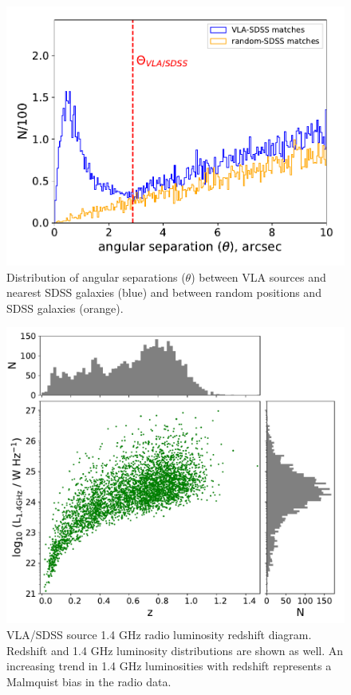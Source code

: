 \begin{figure}
 \begin{center}
  \includegraphics[width=0.75\columnwidth]{plots_chp2/sep_dist_opt.pdf}
  \caption[Cross-match radius determination for VLA/SDSS catalogue]{Distribution of angular separations ($\theta$) between VLA sources and nearest SDSS galaxies (blue) and  between random positions and  SDSS galaxies (orange).}
  \label{fig:jvla-sdss-dist}
 \end{center}
\end{figure}

\begin{figure}
 \begin{center}
   \includegraphics[width=0.8\columnwidth]{plots_chp2/radio_AGN_lum_redshift.pdf}
   \caption[VLA/SDSS source 1.4 GHz radio luminosity redshift diagram]{VLA/SDSS source 1.4 GHz radio luminosity redshift diagram. Redshift and 1.4 GHz luminosity distributions are shown as well. An increasing trend in 1.4 GHz luminosities with redshift represents a Malmquist bias in the radio data.}
   \label{fig:jvla-sdss-lum}
 \end{center}
\end{figure}

